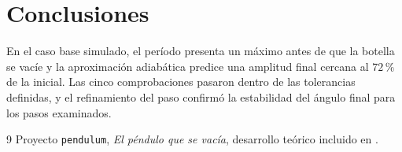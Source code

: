 \documentclass[11pt,a4paper]{article}
\begin{document}
\section{Conclusiones}
En el caso base simulado, el período presenta un máximo antes de que la
botella se vacíe y la aproximación adiabática predice una amplitud final
cercana al \(72\,\%\) de la inicial. Las cinco comprobaciones pasaron
dentro de las tolerancias definidas, y el refinamiento del paso confirmó
la estabilidad del ángulo final para los pasos examinados.

\begin{thebibliography}{9}
Proyecto \texttt{pendulum}, \emph{El péndulo que se vacía},
desarrollo teórico incluido en .
\end{thebibliography}
\end{document}

